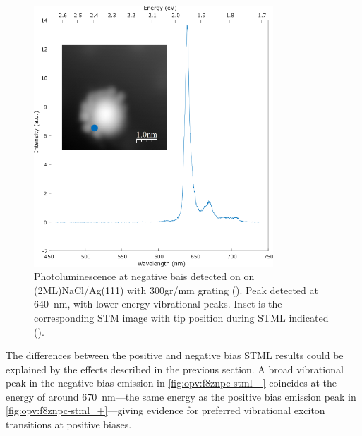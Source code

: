 \begin{figure} [H]
    \centering
           \includegraphics[width=0.8\textwidth]{pictures/f8znpc_-ve_emission_inset300.png}
        \caption{Photoluminescence at negative bais detected on  on (2ML)NaCl/Ag(111) with 300gr/mm grating (). Peak detected at \SI{640}{nm}, with lower energy vibrational peaks. Inset is the corresponding STM image with tip position during STML indicated ().}
        \label{fig:opv:f8znpc-stml_-}
\end{figure}


The differences between the positive and negative bias \ac{STML} results could be explained by the effects described in the previous section. A broad vibrational peak in the negative bias emission in \autoref{fig:opv:f8znpc-stml_-} coincides at the energy of around \SI{670}{nm}---the same energy as the positive bias emission peak in \autoref{fig:opv:f8znpc-stml_+}---giving evidence for preferred vibrational exciton transitions at positive biases.
\newpage

